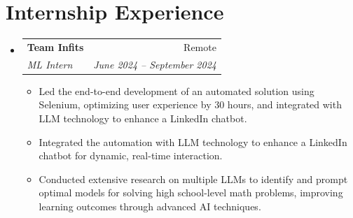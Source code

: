 \documentclass[letterpaper,10pt]{article}
\makeatletter
\newcommand{\resumeItem}[1]{
  \item{\small\setlength{\baselineskip}{10pt} #1 \vspace{-2pt}}
}
\newcommand{\resumeSubheading}[4]{
  \vspace{-2pt}\item
    \begin{tabular*}{\textwidth}[t]{@{}p{0.75\textwidth}@{\extracolsep{\fill}}r@{}}
      \textbf{#1} & \small #2 \\
      \textit{\small#3} & \textit{\small #4} \\
    \end{tabular*}\vspace{-4pt}
}
\newcommand{\resumeSubHeadingListStart}{\begin{itemize}[leftmargin=0in, label={}, topsep=0pt, partopsep=0pt]}
\newcommand{\resumeSubHeadingListEnd}{\end{itemize}}
\newcommand{\resumeItemListStart}{\begin{itemize}[leftmargin=0.15in, label={$\bullet$}, topsep=0pt, partopsep=0pt, itemsep=3pt, parsep=0pt]}
\newcommand{\resumeItemListEnd}{\end{itemize}}
\makeatother
\begin{document}
\section{Internship Experience}
\resumeSubHeadingListStart
  \resumeSubheading
    {Team Infits}{Remote}
    {ML Intern}{June 2024 -- September 2024}
    \resumeItemListStart
      \resumeItem{Led the end-to-end development of an automated solution using Selenium, optimizing user experience by 30 hours, and integrated with LLM technology to enhance a LinkedIn chatbot.}
      \resumeItem{Integrated the automation with LLM technology to enhance a LinkedIn chatbot for dynamic, real-time interaction.}
      \resumeItem{Conducted extensive research on multiple LLMs to identify and prompt optimal models for solving high school-level math problems, improving learning outcomes through advanced AI techniques.}
    \resumeItemListEnd
\resumeSubHeadingListEnd
\end{document}
